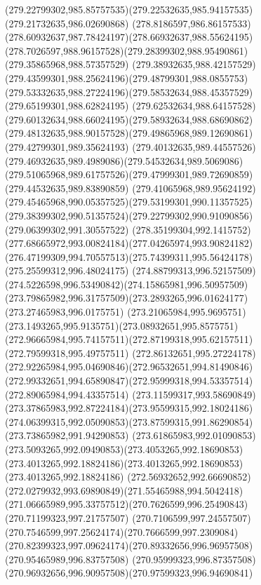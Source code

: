 {    \curveto(279.22799302,985.85757535)(279.22532635,985.94157535)(279.21732635,986.02690868)
    \curveto(278.8186597,986.86157533)(278.60932637,987.78424197)(278.66932637,988.55624195)
    \curveto(278.7026597,988.96157528)(279.28399302,988.95490861)(279.35865968,988.57357529)
    \curveto(279.38932635,988.42157529)(279.43599301,988.25624196)(279.48799301,988.0855753)
    \curveto(279.53332635,988.27224196)(279.58532634,988.45357529)(279.65199301,988.62824195)
    \curveto(279.62532634,988.64157528)(279.60132634,988.66024195)(279.58932634,988.68690862)
    \curveto(279.48132635,988.90157528)(279.49865968,989.12690861)(279.42799301,989.35624193)
    \curveto(279.40132635,989.44557526)(279.46932635,989.4989086)(279.54532634,989.5069086)
    \curveto(279.51065968,989.61757526)(279.47999301,989.72690859)(279.44532635,989.83890859)
    \curveto(279.41065968,989.95624192)(279.45465968,990.05357525)(279.53199301,990.11357525)
    \curveto(279.38399302,990.51357524)(279.22799302,990.91090856)(279.06399302,991.30557522)
    \curveto(278.35199304,992.1415752)(277.68665972,993.00824184)(277.04265974,993.90824182)
    \curveto(276.47199309,994.70557513)(275.74399311,995.56424178)(275.25599312,996.48024175)
    \curveto(274.88799313,996.52157509)(274.5226598,996.53490842)(274.15865981,996.50957509)
    \curveto(273.79865982,996.31757509)(273.2893265,996.01624177)(273.27465983,996.0175751)
    \curveto(273.21065984,995.9695751)(273.1493265,995.9135751)(273.08932651,995.8575751)
    \curveto(272.96665984,995.74157511)(272.87199318,995.62157511)(272.79599318,995.49757511)
    \curveto(272.86132651,995.27224178)(272.92265984,995.04690846)(272.96532651,994.81490846)
    \curveto(272.99332651,994.65890847)(272.95999318,994.53357514)(272.89065984,994.43357514)
    \curveto(273.11599317,993.58690849)(273.37865983,992.87224184)(273.95599315,992.18024186)
    \curveto(274.06399315,992.05090853)(273.87599315,991.86290854)(273.73865982,991.94290853)
    \curveto(273.61865983,992.01090853)(273.5093265,992.09490853)(273.4053265,992.18690853)
    \curveto(273.4013265,992.18824186)(273.4013265,992.18690853)(273.4013265,992.18824186)
    \curveto(272.56932652,992.66690852)(272.0279932,993.69890849)(271.55465988,994.5042418)
    \curveto(271.06665989,995.33757512)(270.7626599,996.25490843)(270.71199323,997.21757507)
    \curveto(270.7106599,997.24557507)(270.7546599,997.25624174)(270.7666599,997.2309084)
    \curveto(270.82399323,997.09624174)(270.89332656,996.96957508)(270.95465989,996.83757508)
    \curveto(270.95999323,996.87357508)(270.96932656,996.90957508)(270.97599323,996.94690841)
}
